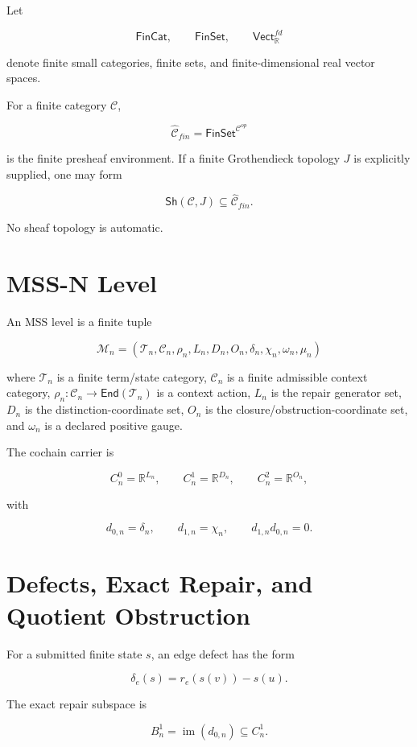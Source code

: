 \documentclass[11pt]{article}
\theoremstyle{definition}
\begin{document}
Let

\[
\mathsf{FinCat},\qquad \mathsf{FinSet},\qquad \mathsf{Vect}^{fd}_{\mathbb R}
\]

denote finite small categories, finite sets, and finite-dimensional real vector spaces.

For a finite category \(\mathcal C\),

\[
\widehat{\mathcal C}_{fin}=\mathsf{FinSet}^{\mathcal C^{op}}
\]

is the finite presheaf environment. If a finite Grothendieck topology \(J\) is explicitly supplied, one may form

\[
\mathsf{Sh}(\mathcal C,J)\subseteq\widehat{\mathcal C}_{fin}.
\]

No sheaf topology is automatic.

\section{MSS-N Level}

An MSS level is a finite tuple

\[
\mathcal M_n=(\mathcal T_n,\mathcal C_n,\rho_n,L_n,D_n,O_n,\delta_n,\chi_n,\omega_n,\mu_n)
\]

where \(\mathcal T_n\) is a finite term/state category, \(\mathcal C_n\) is a finite admissible context category, \(\rho_n:\mathcal C_n\to\mathsf{End}(\mathcal T_n)\) is a context action, \(L_n\) is the repair generator set, \(D_n\) is the distinction-coordinate set, \(O_n\) is the closure/obstruction-coordinate set, and \(\omega_n\) is a declared positive gauge.

The cochain carrier is

\[
C^0_n=\mathbb R^{L_n},\qquad
C^1_n=\mathbb R^{D_n},\qquad
C^2_n=\mathbb R^{O_n},
\]

with

\[
d_{0,n}=\delta_n,
\qquad
d_{1,n}=\chi_n,
\qquad
d_{1,n}d_{0,n}=0.
\]

\section{Defects, Exact Repair, and Quotient Obstruction}

For a submitted finite state \(s\), an edge defect has the form

\[
\delta_e(s)=r_e(s(v))-s(u).
\]

The exact repair subspace is

\[
B^1_n=\operatorname{im}(d_{0,n})\subseteq C^1_n.
\]
\end{document}

